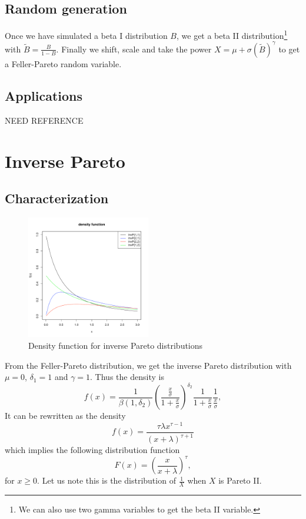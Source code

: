 \subsection{Random generation}
Once we have simulated a beta I distribution $B$, we get a beta II distribution\footnote{We can also use two gamma variables to get the beta II variable.} with $\tilde B = \frac{B}{1-B}$. Finally we shift, scale and take the power $X = \mu +\sigma\left(\tilde B\right)^\gamma$ to get a Feller-Pareto random variable.  

\subsection{Applications}
NEED REFERENCE


\newpage
\section{Inverse Pareto}
\subsection{Characterization}
\begin{figure}
  \vspace{-40pt}
  \begin{center}
    \includegraphics[width=0.48\textwidth]{img/invparetozoom}
  \end{center}
  \vspace{-20pt}  
  \caption{Density function for inverse Pareto distributions}
  \vspace{-20pt}  
\end{figure}
From the Feller-Pareto distribution, we get the inverse Pareto distribution with $\mu=0$,
$\delta_1=1$ and $\gamma=1$. Thus the density is
$$
f(x) =  \frac{1 }{ \beta(1, \delta_2)   }
\left(\frac{ \frac{x}{\sigma} }{ 1+\frac{x}{\sigma} } \right)^{\delta_2}  
\frac{ 1 }{ 1+\frac{x}{\sigma} } \frac{ 1 }{  \frac{x}{\sigma} },
$$
It can be rewritten as the density
$$
f(x) =  \frac{\tau\lambda x^{\tau-1}}{(x+\lambda)^{\tau+1}} 
$$
which implies the following distribution function
$$
F(x) = \left( \frac{x}{x+\lambda}\right)^\tau,
$$
for $x\geq 0$.
Let us note this is the distribution of $\frac{1}{X}$ when $X$ is Pareto II.


